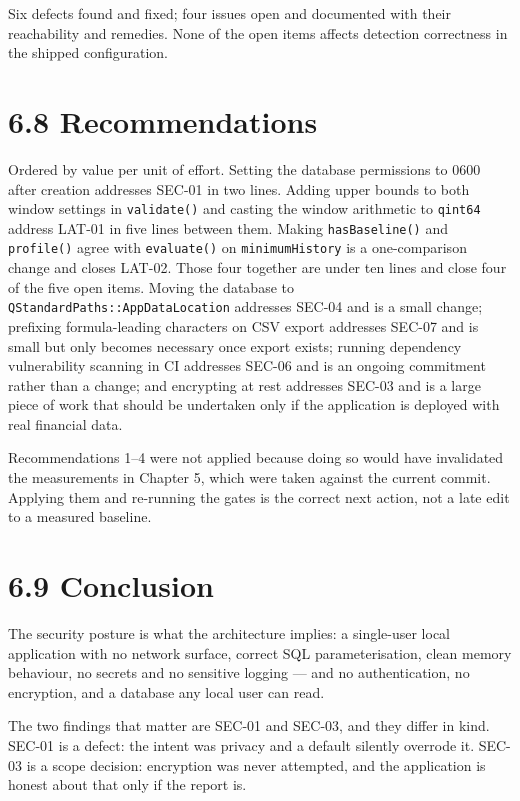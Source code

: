 \documentclass[
  12pt,
]{report}
\begin{document}
Six defects found and fixed; four issues open and documented with their
reachability and remedies. None of the open items affects detection
correctness in the shipped configuration.

\section{6.8 Recommendations}\label{recommendations}

Ordered by value per unit of effort. Setting the database permissions to
0600 after creation addresses SEC-01 in two lines. Adding upper bounds
to both window settings in \texttt{validate()} and casting the window
arithmetic to \texttt{qint64} address LAT-01 in five lines between them.
Making \texttt{hasBaseline()} and \texttt{profile()} agree with
\texttt{evaluate()} on \texttt{minimumHistory} is a one-comparison
change and closes LAT-02. Those four together are under ten lines and
close four of the five open items. Moving the database to
\texttt{QStandardPaths::AppDataLocation} addresses SEC-04 and is a small
change; prefixing formula-leading characters on CSV export addresses
SEC-07 and is small but only becomes necessary once export exists;
running dependency vulnerability scanning in CI addresses SEC-06 and is
an ongoing commitment rather than a change; and encrypting at rest
addresses SEC-03 and is a large piece of work that should be undertaken
only if the application is deployed with real financial data.

Recommendations 1--4 were not applied because doing so would have
invalidated the measurements in Chapter 5, which were taken against the
current commit. Applying them and re-running the gates is the correct
next action, not a late edit to a measured baseline.

\section{6.9 Conclusion}\label{conclusion-1}

The security posture is what the architecture implies: a single-user
local application with no network surface, correct SQL parameterisation,
clean memory behaviour, no secrets and no sensitive logging --- and no
authentication, no encryption, and a database any local user can read.

The two findings that matter are SEC-01 and SEC-03, and they differ in
kind. SEC-01 is a defect: the intent was privacy and a default silently
overrode it. SEC-03 is a scope decision: encryption was never attempted,
and the application is honest about that only if the report is.
\end{document}
